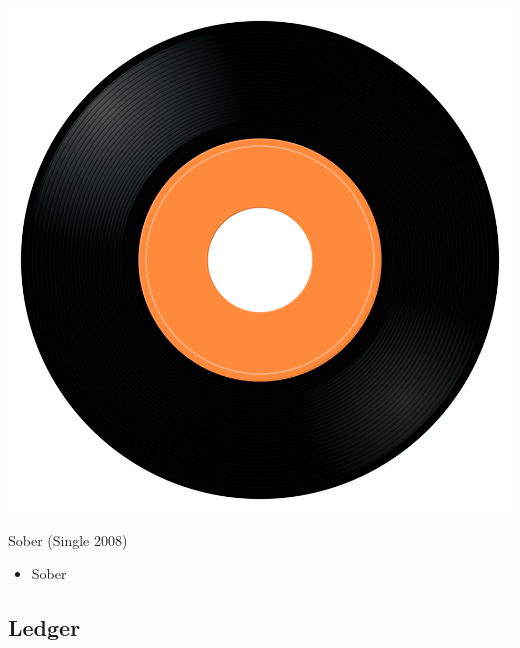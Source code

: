 \begin{minipage}[t]{0.25\textwidth}
\captionsetup{type=figure}
\includegraphics[width=\textwidth]{Images/cover.png}
\caption*{Sober (Single 2008)}
\end{minipage}
\begin{minipage}[t]{0.25\textwidth}\vspace{0pt}
\begin{itemize}[nosep,leftmargin=1em,labelwidth=*,align=left]
	\setlength{\itemsep}{0pt}
	\item Sober
\end{itemize}
\end{minipage}

\subsection{Ledger}

